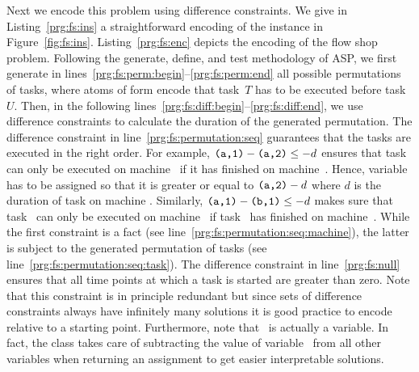 

%
Next we encode this problem using difference constraints.
We give in Listing~\ref{prg:fs:ins} a straightforward encoding of the instance in Figure~\ref{fig:fs:ins}.
Listing~\ref{prg:fs:enc} depicts the encoding of the flow shop problem.
Following the generate, define, and test methodology of ASP,
we first generate in lines~\ref{prg:fs:perm:begin}--\ref{prg:fs:perm:end} all possible permutations of tasks,
where atoms of form  encode that task~$T$ has to be executed before task~$U$.
Then, in the following lines~\ref{prg:fs:diff:begin}--\ref{prg:fs:diff:end},
we use difference constraints to calculate the duration of the generated permutation.
%
The difference constraint in line~\ref{prg:fs:permutation:seq} guarantees that the tasks are executed in the right order.
For example, $\texttt{(a,1)} - \texttt{(a,2)} \leq -d$ ensures that task~ can only be executed on machine~ if it has finished on machine~.
Hence, variable  has to be assigned so that it is greater or equal to $\texttt{(a,2)}-d$ where $d$ is the duration of task  on machine .
Similarly, $\texttt{(a,1)} - \texttt{(b,1)} \leq -d$ makes sure that task~ can only be executed on machine~ if task~ has finished on machine~.
While the first constraint is a fact (see line~\ref{prg:fs:permutation:seq:machine}),
the latter is subject to the generated permutation of tasks (see line~\ref{prg:fs:permutation:seq:task}).
%
The difference constraint in line~\ref{prg:fs:null} ensures that all time points at which a task is started are greater than zero.
Note that this constraint is in principle redundant
but since sets of difference constraints always have infinitely many solutions
it is good practice to encode relative to a starting point.
Furthermore, note that~ is actually a variable.
In fact, the  class takes care of subtracting the value of variable~ from all other variables when returning an assignment
to get easier interpretable solutions.

